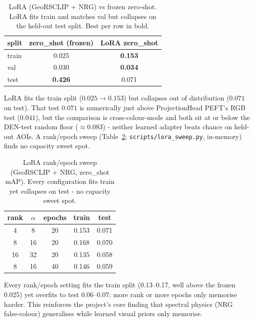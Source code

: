 \documentclass{article}
\begin{document}
\begin{table}[H]
    \centering
    \caption{LoRA (GeoRSCLIP + NRG) vs frozen zero-shot. LoRA fits train and
    matches val but collapses on the held-out test split. Best per row in bold.}
    \label{tab:lora}
    \begin{tabular}{lcc}
        \toprule
        \textbf{split} & \textbf{zero\_shot (frozen)} & \textbf{LoRA zero\_shot} \\
        \midrule
        train & 0.025 & \textbf{0.153} \\
        val   & 0.030 & \textbf{0.034} \\
        test  & \textbf{0.426} & 0.071 \\
        \bottomrule
    \end{tabular}
\end{table}

LoRA fits the train split ($0.025 \rightarrow 0.153$) but collapses out of
distribution ($0.071$ on test). That test $0.071$ is numerically just above
ProjectionHead PEFT's RGB test ($0.041$), but the comparison is cross-colour-mode
and both sit at or below the DEN-test random floor ($\approx 0.083$) - neither
learned adapter beats chance on held-out AOIs. A rank/epoch sweep
(Table~\ref{tab:lorasweep}; \texttt{scripts/lora\_sweep.py}, in-memory) finds no
capacity sweet spot.

\begin{table}[H]
    \centering
    \caption{LoRA rank/epoch sweep (GeoRSCLIP + NRG, zero\_shot mAP). Every
    configuration fits train yet collapses on test - no capacity sweet spot.}
    \label{tab:lorasweep}
    \begin{tabular}{ccccc}
        \toprule
        \textbf{rank} & \textbf{$\alpha$} & \textbf{epochs} & \textbf{train} & \textbf{test} \\
        \midrule
        4  & 8  & 20 & 0.153 & 0.071 \\
        8  & 16 & 20 & 0.168 & 0.070 \\
        16 & 32 & 20 & 0.135 & 0.058 \\
        8  & 16 & 40 & 0.146 & 0.059 \\
        \bottomrule
    \end{tabular}
\end{table}

Every rank/epoch setting fits the train split (0.13--0.17, well above the frozen
0.025) yet overfits to test 0.06--0.07; more rank or more epochs only memorise
harder. This reinforces the project's core finding that spectral physics (NRG
false-colour) generalises while learned visual priors only memorise.
\end{document}
